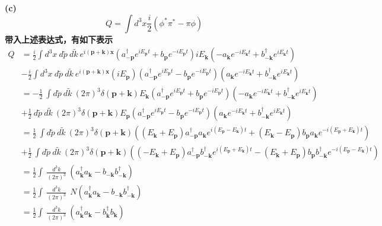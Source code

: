 \documentclass{article}
\begin{document}
\bf{(c)}
$$
Q=\int d^3 x  \frac{i}{2} \left( \phi^{*} \pi^{*} - \pi \phi \right)
$$
带入上述表达式，有如下表示
\begin{align}
Q &= \frac{i}{2} \int d^3 x \: 
	d \widetilde{p} \: d \widetilde{k} \: e^{i (\mathbf{p}+\mathbf{k}) \mathbf{x}}
	\left(
	a^{\dagger}_{-\mathbf{p}} e^{i E_{\mathbf{p}}t} +  b_{\mathbf{p}} e^{-i E_{\mathbf{p}}t} 
	\right) 
	i E_{\mathbf{k}}
	\left(
	- a_{\mathbf{k}} e^{-i E_{\mathbf{k}}t} +  b^{\dagger}_{-\mathbf{k}} e^{i E_{\mathbf{k}}t} 
	\right) \nonumber \\
 & -\frac{i}{2} \int d^3 x \: 
	d \widetilde{p} \: d \widetilde{k} \: e^{i (\mathbf{p}+\mathbf{k}) \mathbf{x}}
	(i E_{\mathbf{p}}) 
	\left(
	a^{\dagger}_{-\mathbf{p}} e^{i E_{\mathbf{p}}t} -  b_{\mathbf{p}} e^{-i E_{\mathbf{p}}t} 
	\right) 
	\left(
	a_{\mathbf{k}} e^{-i E_{\mathbf{k}}t} +  b^{\dagger}_{-\mathbf{k}} e^{i E_{\mathbf{k}}t} 
	\right)   \nonumber \\
 &=-\frac{1}{2}  \: \int
	d \widetilde{p} \: d \widetilde{k} \: (2 \pi)^3 \delta(\mathbf{p}+\mathbf{k}) E_{\mathbf{k}}
	\left(
	a^{\dagger}_{-\mathbf{p}} e^{i E_{\mathbf{p}}t} +  b_{\mathbf{p}} e^{-i E_{\mathbf{p}}t} 
	\right) 
	\left(
	- a_{\mathbf{k}} e^{-i E_{\mathbf{k}}t} +  b^{\dagger}_{-\mathbf{k}} e^{i E_{\mathbf{k}}t} 
	\right) \nonumber \\
 & + \frac{1}{2} \:
 	d \widetilde{p} \: d \widetilde{k} \: (2 \pi)^3 \delta(\mathbf{p}+\mathbf{k}) E_{\mathbf{p}}
	\left(
	a^{\dagger}_{-\mathbf{p}} e^{i E_{\mathbf{p}}t} -  b_{\mathbf{p}} e^{-i E_{\mathbf{p}}t} 
	\right) 
	\left(
	a_{\mathbf{k}} e^{-i E_{\mathbf{k}}t} +  b^{\dagger}_{-\mathbf{k}} e^{i E_{\mathbf{k}}t} 
	\right)   \nonumber \\
 &= \frac{1}{2}  \: \int
	d \widetilde{p} \: d \widetilde{k} \: (2 \pi)^3 \delta(\mathbf{p}+\mathbf{k}) 
	\left(
	(E_{\mathbf{k}}+E_{\mathbf{p}})a^{\dagger}_{-\mathbf{p}} a_{\mathbf{k}} e^{i (E_{\mathbf{p}}-E_{\mathbf{k}})t} 
+	(E_{\mathbf{k}}-E_{\mathbf{p}})b_{\mathbf{p}} a_{\mathbf{k}} e^{-i(E_{\mathbf{p}}+E_{\mathbf{k}})t}
	\right) \nonumber \\
&+ \frac{1}{2}  \: \int
	d \widetilde{p} \: d \widetilde{k} \: (2 \pi)^3 \delta(\mathbf{p}+\mathbf{k}) 
	\left(
	(-E_{\mathbf{k}}+E_{\mathbf{p}})a^{\dagger}_{-\mathbf{p}}  b^{\dagger}_{-\mathbf{k}} e^{i (E_{\mathbf{p}}+E_{\mathbf{k}})t} 
-(E_{\mathbf{k}}+E_{\mathbf{p}}) b_{\mathbf{p}}  b^{\dagger}_{-\mathbf{k}}e^{-i (E_{\mathbf{p}}-E_{\mathbf{k}})t} 
	\right) \nonumber \\
&= \frac{1}{2} \int \: \frac{d^3 k }{(2 \pi)^3 } \:
	 (a^{\dagger}_{\mathbf{k}} a_{\mathbf{k}} - b_{\mathbf{-k}} b^{\dagger}_{\mathbf{-k}} )  \nonumber \\
&=\frac{1}{2} \int \: \frac{d^3 k }{(2 \pi)^3 } \:
	  \: N(a^{\dagger}_{\mathbf{k}} a_{\mathbf{k}} - b_{\mathbf{-k}} b^{\dagger}_{\mathbf{-k}})  \nonumber \\
&=\frac{1}{2} \int \: \frac{d^3 k }{(2 \pi)^3 } \:
	 (a^{\dagger}_{\mathbf{k}} a_{\mathbf{k}} - b^{\dagger}_{\mathbf{k}} b_{\mathbf{k}}  )  \nonumber 
\end{align}
\end{document}

